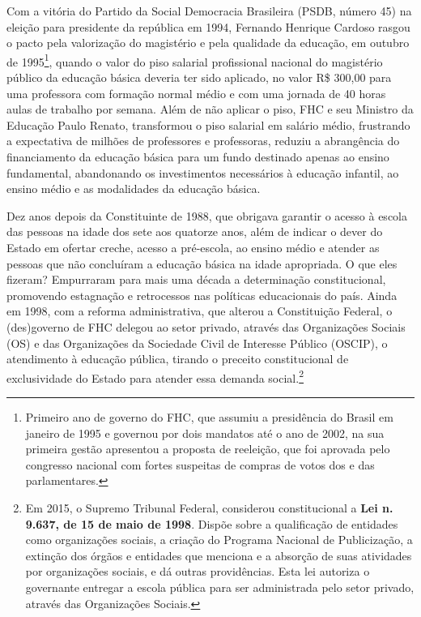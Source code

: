Com a vitória do Partido da Social Democracia Brasileira (PSDB, número
45) na eleição para presidente da república em 1994, Fernando Henrique
Cardoso rasgou o pacto pela valorização do magistério e pela qualidade
da educação, em outubro de 1995\footnote{Primeiro ano de governo do FHC,
  que assumiu a presidência do Brasil em janeiro de 1995 e governou por
  dois mandatos até o ano de 2002, na sua primeira gestão apresentou a
  proposta de reeleição, que foi aprovada pelo congresso nacional com
  fortes suspeitas de compras de votos dos e das parlamentares.}, quando
o valor do piso salarial profissional nacional do magistério público da
educação básica deveria ter sido aplicado, no valor R\$ 300,00 para uma
professora com formação normal médio e com uma jornada de 40 horas aulas
de trabalho por semana. Além de não aplicar o piso, FHC e seu Ministro
da Educação Paulo Renato, transformou o piso salarial em salário médio,
frustrando a expectativa de milhões de professores e professoras,
reduziu a abrangência do financiamento da educação básica para um fundo
destinado apenas ao ensino fundamental, abandonando os investimentos
necessários à educação infantil, ao ensino médio e as modalidades da
educação básica.

Dez anos depois da Constituinte de 1988, que obrigava garantir o acesso
à escola das pessoas na idade dos sete aos quatorze anos, além de
indicar o dever do Estado em ofertar creche, acesso a pré-escola, ao
ensino médio e atender as pessoas que não concluíram a educação básica
na idade apropriada. O que eles fizeram? Empurraram para mais uma década
a determinação constitucional, promovendo estagnação e retrocessos nas
políticas educacionais do país. Ainda em 1998, com a reforma
administrativa, que alterou a Constituição Federal, o (des)governo de
FHC delegou ao setor privado, através das Organizações Sociais (OS) e
das Organizações da Sociedade Civil de Interesse Público (OSCIP), o
atendimento à educação pública, tirando o preceito constitucional de
exclusividade do Estado para atender essa demanda social.\footnote{Em
  2015, o Supremo Tribunal Federal, considerou constitucional a
  \textbf{Lei n. 9.637, de 15 de maio de 1998}. Dispõe sobre a
  qualificação de entidades como organizações sociais, a criação do
  Programa Nacional de Publicização, a extinção dos órgãos e entidades
  que menciona e a absorção de suas atividades por organizações sociais,
  e dá outras providências. Esta lei autoriza o governante entregar a
  escola pública para ser administrada pelo setor privado, através das
  Organizações Sociais.}

